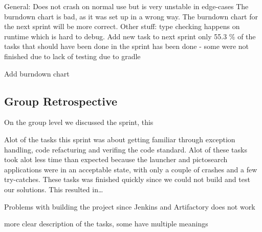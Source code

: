 General:
Does not crash on normal use but is very unstable in edge-cases
The burndown chart is bad, as it was set up in a wrong way. The burndown chart for the next sprint will be more correct.
Other stuff:
type checking happens on runtime which is hard to debug.
Add new task to next sprint
only 55.3 \% of the tasks that should have been done in the sprint has been
done - some were not finished due to lack of testing due to gradle

Add burndown chart


\subsection{Group Retrospective}

On the group level we discussed the sprint, this 



Alot of the tasks this sprint was about getting familiar through exception
handling, code refacturing and verifing the code standard. Alot of these tasks
took alot less time than expected because the launcher and pictosearch
applications were in an acceptable state, with only a couple of crashes and a
few try-catches. These tasks was finished quickly since we could not build
and test our solutions. This resulted in\ldots 


Problems with building the project since Jenkins and Artifactory does not work

more clear description of the tasks, some have multiple meanings
